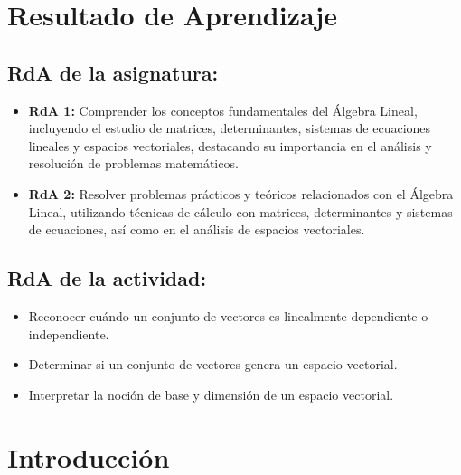 \documentclass[a4,11pt]{aleph-notas}
\begin{document}
\encabezado 

\section*{Resultado de Aprendizaje}

\subsection*{RdA de la asignatura:}
\begin{itemize}[leftmargin=*]
    \item \textbf{RdA 1:} Comprender los conceptos fundamentales del Álgebra Lineal, incluyendo el estudio de matrices, determinantes, sistemas de ecuaciones lineales y espacios vectoriales, destacando su importancia en el análisis y resolución de problemas matemáticos.
    \item \textbf{RdA 2:} Resolver problemas prácticos y teóricos relacionados con el Álgebra Lineal, utilizando técnicas de cálculo con matrices, determinantes y sistemas de ecuaciones, así como en el análisis de espacios vectoriales.    
\end{itemize}


\subsection*{RdA de la actividad:}
\begin{itemize}[leftmargin=*]
    \item Reconocer cuándo un conjunto de vectores es linealmente dependiente o independiente.
    \item Determinar si un conjunto de vectores genera un espacio vectorial.
    \item Interpretar la noción de base y dimensión de un espacio vectorial.
\end{itemize}

\section*{Introducción}
\end{document}
